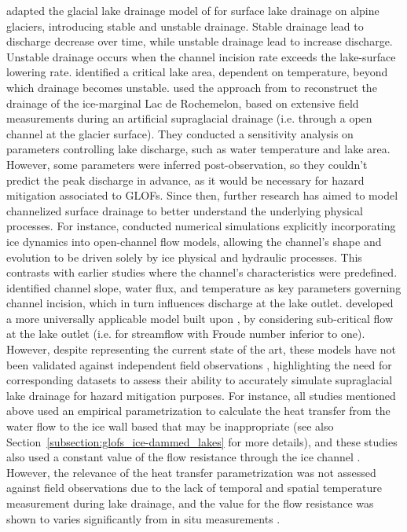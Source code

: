 \cite{Raymond&Nolan2000} adapted the glacial lake drainage model of \cite{Walder&Costa1996} for surface lake drainage on alpine glaciers, introducing stable and unstable drainage. Stable drainage lead to discharge decrease over time, while unstable drainage lead to increase discharge. Unstable drainage occurs when the channel incision rate exceeds the lake-surface lowering rate. \cite{Raymond&Nolan2000} identified a critical lake area, dependent on temperature, beyond which drainage becomes unstable. \cite{Vincent&al2010} used the approach from \cite{Raymond&Nolan2000} to reconstruct the drainage of the ice-marginal Lac de Rochemelon, based on extensive field measurements during an artificial supraglacial drainage (i.e. through a open channel at the glacier surface). They conducted a sensitivity analysis on parameters controlling lake discharge, such as water temperature and lake area. However, some parameters were inferred post-observation, so they couldn't predict the peak discharge in advance, as it would be necessary for hazard mitigation associated to GLOFs. Since then, further research has aimed to model channelized surface drainage to better understand the underlying physical processes. For instance,\cite{Jarosch&Gudmundsson2012} conducted numerical simulations explicitly incorporating ice dynamics into open-channel flow models, allowing the channel's shape and evolution to be driven solely by ice physical and hydraulic processes. This contrasts with earlier studies \citep{Walder&Costa1996, Raymond&Nolan2000} where the channel's characteristics were predefined. \cite{Jarosch&Gudmundsson2012} identified channel slope, water flux, and temperature as key parameters governing channel incision, which in turn influences discharge at the lake outlet. \cite{Kingslake&al2015} developed a more universally applicable model built upon \cite{Raymond&Nolan2000}, by considering sub-critical flow at the lake outlet (i.e. for streamflow with Froude number inferior to one). However, despite representing the current state of the art, these models have not been validated against independent field observations \citep{Pitcher&Smith2019}, highlighting the need for corresponding datasets to assess their ability to accurately simulate supraglacial lake drainage for hazard mitigation purposes. For instance, all studies mentioned above used an empirical parametrization to calculate the heat transfer from the water flow to the ice wall based that may be inappropriate (see also Section~\ref{subsection:glofs_ice-dammed_lakes} for more details), and these studies also used a constant value of the flow resistance through the ice channel \citep[e.g. in][]{Clarke2003,Kingslake&al2015}. However, the relevance of the heat transfer parametrization was not assessed against field observations due to the lack of temporal and spatial temperature measurement during lake drainage, and the value for the flow resistance was shown to varies significantly from in situ measurements \citep{Gleason&al2016}.  



